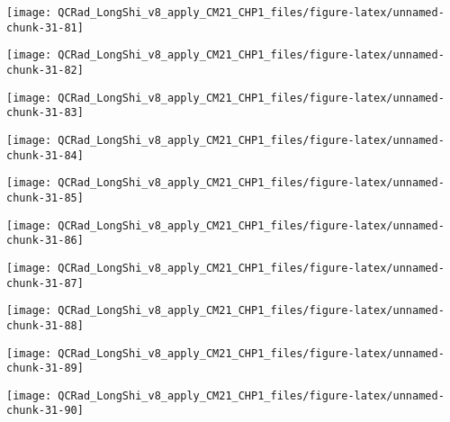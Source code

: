 \documentclass[
  10pt,
  a4paper,oneside]{article}
\begin{document}
\begin{center}\texttt{[image: QCRad\_LongShi\_v8\_apply\_CM21\_CHP1\_files/figure-latex/unnamed-chunk-31-81]} \end{center}

\begin{center}\texttt{[image: QCRad\_LongShi\_v8\_apply\_CM21\_CHP1\_files/figure-latex/unnamed-chunk-31-82]} \end{center}

\begin{center}\texttt{[image: QCRad\_LongShi\_v8\_apply\_CM21\_CHP1\_files/figure-latex/unnamed-chunk-31-83]} \end{center}

\begin{center}\texttt{[image: QCRad\_LongShi\_v8\_apply\_CM21\_CHP1\_files/figure-latex/unnamed-chunk-31-84]} \end{center}

\begin{center}\texttt{[image: QCRad\_LongShi\_v8\_apply\_CM21\_CHP1\_files/figure-latex/unnamed-chunk-31-85]} \end{center}

\begin{center}\texttt{[image: QCRad\_LongShi\_v8\_apply\_CM21\_CHP1\_files/figure-latex/unnamed-chunk-31-86]} \end{center}

\begin{center}\texttt{[image: QCRad\_LongShi\_v8\_apply\_CM21\_CHP1\_files/figure-latex/unnamed-chunk-31-87]} \end{center}

\begin{center}\texttt{[image: QCRad\_LongShi\_v8\_apply\_CM21\_CHP1\_files/figure-latex/unnamed-chunk-31-88]} \end{center}

\begin{center}\texttt{[image: QCRad\_LongShi\_v8\_apply\_CM21\_CHP1\_files/figure-latex/unnamed-chunk-31-89]} \end{center}

\begin{center}\texttt{[image: QCRad\_LongShi\_v8\_apply\_CM21\_CHP1\_files/figure-latex/unnamed-chunk-31-90]} \end{center}
\end{document}
